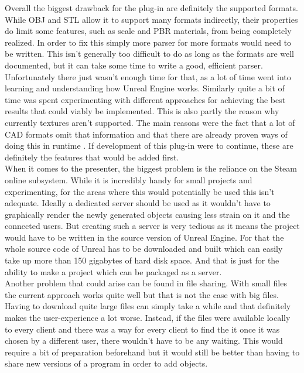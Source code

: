 Overall the biggest drawback for the plug-in are definitely the supported formats. While OBJ and STL allow it to support many formats indirectly, their properties do limit some features, such as scale and PBR materials, from being completely realized. In order to fix this simply more parser for more formats would need to be written. This isn't generally too difficult to do as long as the formats are well documented, but it can take some time to write a good, efficient parser. Unfortunately there just wasn't enough time for that, as a lot of time went into learning and understanding how Unreal Engine works. Similarly quite a bit of time was spent experimenting with different approaches for achieving the best results that could viably be implemented. This is also partly the reason why currently textures aren't supported. The main reasons were the fact that a lot of CAD formats omit that information and that there are already proven ways of doing this in runtime\cite{} \cite{}. If development of this plug-in were to continue, these are definitely the features that would be added first.\\
When it comes to the presenter, the biggest problem is the reliance on the Steam online subsystem. While it is incredibly handy for small projects and experimenting, for the areas where this would potentially be used this isn't adequate. Ideally a dedicated server should be used as it wouldn't have to graphically render the newly generated objects causing less strain on it and the connected users. But creating such a server is very tedious as it means the project would have to be written in the source version of Unreal Engine. For that the whole source code of Unreal has to be downloaded and built which can easily take up more than 150 gigabytes of hard disk space. And that is just for the ability to make a project which can be packaged as a server.\\ 
Another problem that could arise can be found in file sharing. With small files the current approach works quite well but that is not the case with big files. Having to download quite large files can simply take a while and that definitely makes the user-experience a lot worse. Instead, if the files were available locally to every client and there was a way for every client to find the it once it was chosen by a different user, there wouldn't have to be any waiting. This would require a bit of preparation beforehand but it would still be better than having to share new versions of a program in order to add objects.\\